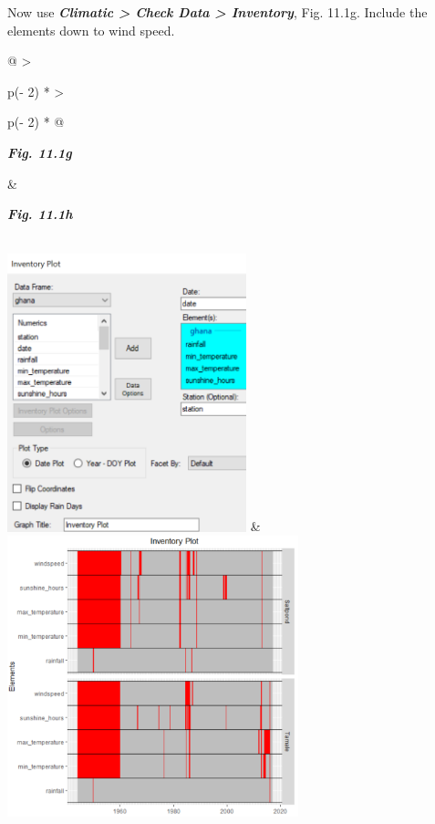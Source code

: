 \documentclass[
  letterpaper,
  DIV=11,
  numbers=noendperiod]{scrreprt}
\begin{document}
Now use \textbf{\emph{Climatic \textgreater{} Check Data \textgreater{}
Inventory}}, Fig. 11.1g. Include the elements down to wind speed.

\begin{longtable}[]{@{}
  >{\raggedright\arraybackslash}p{(\columnwidth - 2\tabcolsep) * }
  >{\raggedright\arraybackslash}p{(\columnwidth - 2\tabcolsep) * }@{}}
\toprule\noalign{}
\begin{minipage}[b]{\linewidth}\raggedright
\textbf{\emph{Fig. 11.1g}}
\end{minipage} & \begin{minipage}[b]{\linewidth}\raggedright
\textbf{\emph{Fig. 11.1h}}
\end{minipage} \\
\midrule\noalign{}
\endhead
\bottomrule\noalign{}
\endlastfoot
\includegraphics[width=2.7294in,height=3.16914in]{figures/Fig11.1g.png}
&
\includegraphics[width=3.32049in,height=3.20243in]{figures/Fig11.1h.png} \\
\end{longtable}
\end{document}
